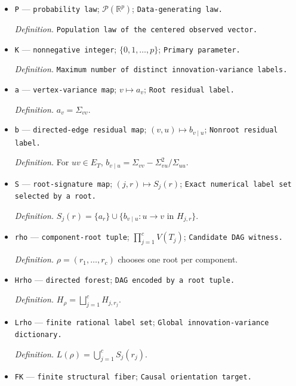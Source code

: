 \documentclass{article}
\begin{document}
\begin{itemize}
  \par\smallskip\noindent\emph{Definition.} \texttt{Population covariance matrix.}
  \item \texttt{P} --- \texttt{probability law}; \(\mathcal P(\mathbb R^p)\); \texttt{Data-\allowbreak{}generating law.}
  \par\smallskip\noindent\emph{Definition.} \texttt{Population law of the centered observed vector.}
  \item \texttt{K} --- \texttt{nonnegative integer}; \(\{0,1,\ldots,p\}\); \texttt{Primary parameter.}
  \par\smallskip\noindent\emph{Definition.} \texttt{Maximum number of distinct innovation-\allowbreak{}variance labels.}
  \item \texttt{a} --- \texttt{vertex-\allowbreak{}variance map}; \(v\mapsto a_v\); \texttt{Root residual label.}
  \par\smallskip\noindent\emph{Definition.} \(a_v=\Sigma_{vv}\).
  \item \texttt{b} --- \texttt{directed-\allowbreak{}edge residual map}; \((v,u)\mapsto b_{v\mid u}\); \texttt{Nonroot residual label.}
  \par\smallskip\noindent\emph{Definition.} For \(uv\in E_T\), \(b_{v\mid u}=\Sigma_{vv}-\Sigma_{vu}^{2}/\Sigma_{uu}\).
  \item \texttt{S} --- \texttt{root-\allowbreak{}signature map}; \((j,r)\mapsto S_j(r)\); \texttt{Exact numerical label set selected by a root.}
  \par\smallskip\noindent\emph{Definition.} \(S_j(r)=\{a_r\}\cup\{b_{v\mid u}:u\to v\text{ in }H_{j,r}\}\).
  \item \texttt{rho} --- \texttt{component-\allowbreak{}root tuple}; \(\prod_{j=1}^{c}V(T_j)\); \texttt{Candidate DAG witness.}
  \par\smallskip\noindent\emph{Definition.} \(\rho=(r_1,\ldots,r_c)\) chooses one root per component.
  \item \texttt{Hrho} --- \texttt{directed forest}; \texttt{DAG encoded by a root tuple.}
  \par\smallskip\noindent\emph{Definition.} \(H_\rho=\bigsqcup_{j=1}^{c}H_{j,r_j}\).
  \item \texttt{Lrho} --- \texttt{finite rational label set}; \texttt{Global innovation-\allowbreak{}variance dictionary.}
  \par\smallskip\noindent\emph{Definition.} \(L(\rho)=\bigcup_{j=1}^{c}S_j(r_j)\).
  \item \texttt{FK} --- \texttt{finite structural fiber}; \texttt{Causal orientation target.}

\end{itemize}
\end{document}
